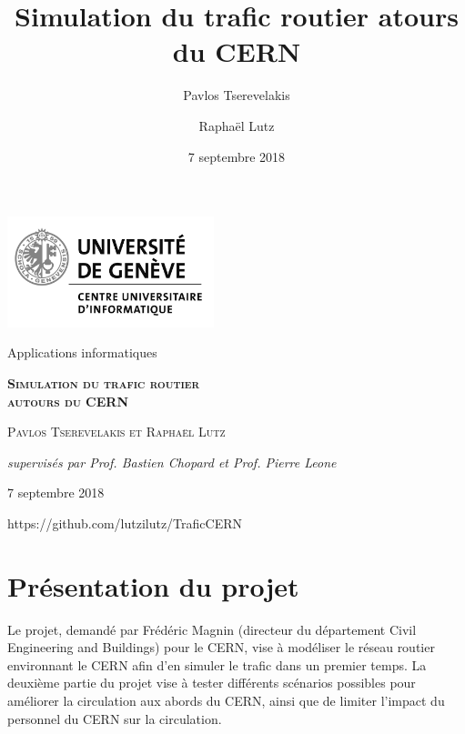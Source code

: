 \documentclass[a4paper,11pt, titlepage]{extarticle}
\title{Simulation du trafic routier atours du CERN}
\author{Pavlos Tserevelakis \and Raphaël Lutz}
\date{7 septembre 2018}
\begin{document}
\begin{titlepage}
	\centering
	\includegraphics[width=0.45\textwidth]{logoUni.jpg}\par
	\vspace{3cm}
	{\Large Applications informatiques \par}
	\vspace{1.5cm}
	{\scshape\huge\bfseries Simulation du trafic routier\\autours du CERN\par}
	\vspace{1.5cm}
	{\scshape\Large Pavlos Tserevelakis et Raphaël Lutz\par}
	\vspace{1.5cm}
	{\large\itshape supervisés par Prof. Bastien Chopard et Prof. Pierre Leone\par}
	\vspace{1.5cm}
	{7 septembre 2018\par}
	\vspace{5cm}
	{https://github.com/lutzilutz/TraficCERN\par}
	\vfill
\end{titlepage}


\tableofcontents\newpage

\pagestyle{fancy}
\renewcommand{\headheight}{24pt}

\section{Présentation du projet}

Le projet, demandé par Frédéric Magnin (directeur du département Civil Engineering and Buildings) pour le CERN, vise à modéliser le réseau routier environnant le CERN afin d'en simuler le trafic dans un premier temps. La deuxième partie du projet vise à tester différents scénarios possibles pour améliorer la circulation aux abords du CERN, ainsi que de limiter l'impact du personnel du CERN sur la circulation.
\end{document}
